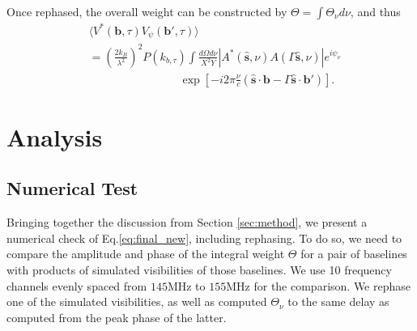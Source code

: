 \documentclass[twocolumn,apj,numberedappendix]{emulateapj}
\renewcommand\[{\begin{equation}}
\renewcommand\]{\end{equation}}
\begin{document}
Once rephased, the overall weight can be constructed by $\Theta=\int \Theta_{\nu}d\nu$, and thus
\begin{equation}
\begin{aligned} & \langle V^{*}(\boldsymbol{b},\tau)V_{\psi}(\boldsymbol{b'},\tau)\rangle\\
 & =\left(\frac{2k_{B}}{\lambda^{2}}\right)^{2}P(k_{b,\tau})\int\frac{d\Omega d\nu}{X^{2}Y}|A^{*}(\hat{\boldsymbol{s}},\nu)A(\Gamma\hat{\boldsymbol{s}},\nu)|e^{i\psi_{\nu}}\\
 & \qquad \qquad \qquad \qquad \exp\left[-i2\pi\frac{\nu}{c}\left(\hat{\boldsymbol{s}}\cdot\boldsymbol{b}-\Gamma\hat{\boldsymbol{s}}\cdot\boldsymbol{b'}\right)\right].\end{aligned}
\label{eq:final_new}
\end{equation}


\section{Analysis}
\subsection{Numerical Test \label{sec:Techniquet}}

Bringing together the discussion from Section \ref{sec:method}, we present a numerical check of Eq.\ref{eq:final_new}, including rephasing. To do so, we need to compare the amplitude and phase of the integral weight $\Theta$ 
for a pair of baselines with products of simulated visibilities of those baselines. We use 10 frequency channels evenly spaced from $145$MHz to $155$MHz for the comparison. We rephase one of the simulated visibilities, as well as computed $\Theta_{\nu}$ to the same delay as computed from the peak phase of the latter. 
 
\end{document}
